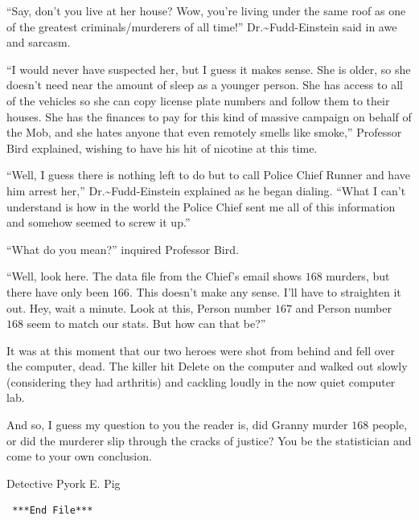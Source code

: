 \documentclass[captions=tableheading]{scrbook}
\begin{document}
“Say, don’t you live at her house? Wow, you’re living under the same roof as one of the greatest criminals/murderers of all time!” Dr.\~{}Fudd-Einstein said in awe and sarcasm.

“I would never have suspected her, but I guess it makes sense. She is older, so she doesn’t need near the amount of sleep as a younger person. She has access to all of the vehicles so she can copy license plate numbers and follow them to their houses. She has the finances to pay for this kind of massive campaign on behalf of the Mob, and she hates anyone that even remotely smells like smoke,” Professor Bird explained, wishing to have his hit of nicotine at this time.

“Well, I guess there is nothing left to do but to call Police Chief Runner and have him arrest her,” Dr.\~{}Fudd-Einstein explained as he began dialing. “What I can’t understand is how in the world the Police Chief sent me all of this information and somehow seemed to screw it up.”

“What do you mean?” inquired Professor Bird.

“Well, look here. The data file from the Chief's email shows \(  168 \) murders, but there have only been \(  166 \). This doesn’t make any sense. I’ll have to straighten it out. Hey, wait a minute. Look at this, Person number \(  167 \) and Person number \(  168 \) seem to match our stats. But how can that be?”

It was at this moment that our two heroes were shot from behind and fell over the computer, dead. The killer hit \textsf{Delete} on the computer and walked out slowly (considering they had arthritis) and cackling loudly in the now quiet computer lab.  

And so, I guess my question to you the reader is, did Granny murder \(  168 \) people, or did the murderer slip through the cracks of justice? You be the statistician and come to your own conclusion. 

Detective Pyork E. Pig 

\begin{verbatim}
 ***End File***
\end{verbatim}

\vfill{}

\cleardoublepage
{}
{}

\nocite{*}

\vfill{}
\cleardoublepage
{}
{} 
\printindex{}
\end{document}
